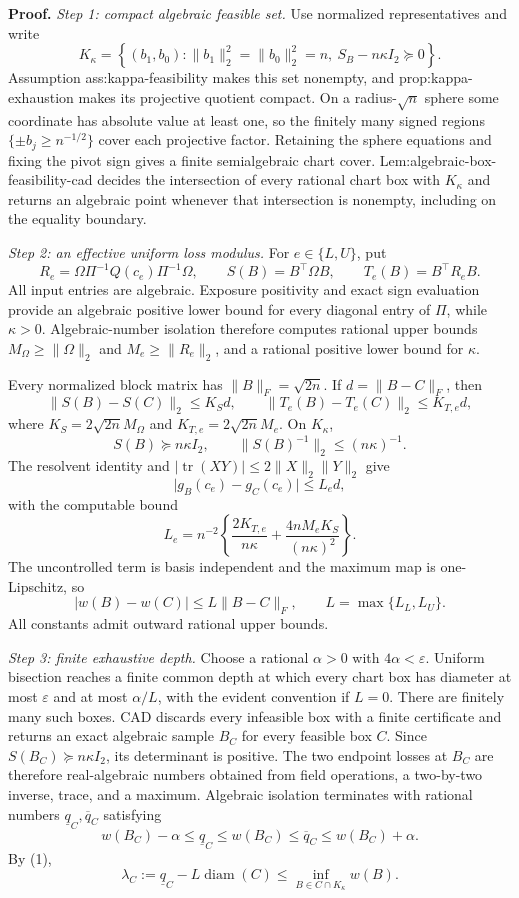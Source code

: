 \textbf{Proof.}
\emph{Step 1: compact algebraic feasible set.}
Use normalized representatives and write
\[
 K_\kappa=\left\{(b_1,b_0):
 \lVert b_1\rVert_2^2=\lVert b_0\rVert_2^2=n,
 \ S_B-n\kappa I_2\succeq0\right\}.
\]
Assumption ass:kappa-feasibility makes this set nonempty, and prop:kappa-exhaustion makes its projective quotient compact.  On a radius-\(\sqrt n\) sphere some coordinate has absolute value at least one, so the finitely many signed regions \(\{\pm b_j\ge n^{-1/2}\}\) cover each projective factor.  Retaining the sphere equations and fixing the pivot sign gives a finite semialgebraic chart cover.  Lem:algebraic-box-feasibility-cad decides the intersection of every rational chart box with \(K_\kappa\) and returns an algebraic point whenever that intersection is nonempty, including on the equality boundary.

\emph{Step 2: an effective uniform loss modulus.}
For \(e\in\{L,U\}\), put
\[
 R_e=\Omega\Pi^{-1}Q(c_e)\Pi^{-1}\Omega,
 \qquad S(B)=B^{\top}\Omega B,
 \qquad T_e(B)=B^{\top}R_eB.
\]
All input entries are algebraic.  Exposure positivity and exact sign evaluation provide an algebraic positive lower bound for every diagonal entry of \(\Pi\), while \(\kappa>0\).  Algebraic-number isolation therefore computes rational upper bounds \(M_\Omega\ge\lVert\Omega\rVert_2\) and \(M_e\ge\lVert R_e\rVert_2\), and a rational positive lower bound for \(\kappa\).

Every normalized block matrix has \(\lVert B\rVert_F=\sqrt{2n}\).  If \(d=\lVert B-C\rVert_F\), then
\[
 \lVert S(B)-S(C)\rVert_2\le K_Sd,
 \qquad
 \lVert T_e(B)-T_e(C)\rVert_2\le K_{T,e}d,
\]
where \(K_S=2\sqrt{2n}M_\Omega\) and \(K_{T,e}=2\sqrt{2n}M_e\).  On \(K_\kappa\),
\[
 S(B)\succeq n\kappa I_2,
 \qquad \lVert S(B)^{-1}\rVert_2\le(n\kappa)^{-1}.
\]
The resolvent identity and \(\lvert\operatorname{tr}(XY)\rvert\le2\lVert X\rVert_2\lVert Y\rVert_2\) give
\[
 \lvert g_B(c_e)-g_C(c_e)\rvert\le L_e d,
\]
with the computable bound
\[
 L_e=n^{-2}\left\{
 \frac{2K_{T,e}}{n\kappa}
 +\frac{4nM_eK_S}{(n\kappa)^2}\right\}.
\]
The uncontrolled term is basis independent and the maximum map is one-Lipschitz, so
\[
 \lvert w(B)-w(C)\rvert\le L\lVert B-C\rVert_F,
 \qquad L=\max\{L_L,L_U\}.
 \tag{1}
\]
All constants admit outward rational upper bounds.

\emph{Step 3: finite exhaustive depth.}
Choose a rational \(\alpha>0\) with \(4\alpha<\varepsilon\).  Uniform bisection reaches a finite common depth at which every chart box has diameter at most \(\varepsilon\) and at most \(\alpha/L\), with the evident convention if \(L=0\).  There are finitely many such boxes.  CAD discards every infeasible box with a finite certificate and returns an exact algebraic sample \(B_C\) for every feasible box \(C\).  Since \(S(B_C)\succeq n\kappa I_2\), its determinant is positive.  The two endpoint losses at \(B_C\) are therefore real-algebraic numbers obtained from field operations, a two-by-two inverse, trace, and a maximum.  Algebraic isolation terminates with rational numbers \(\underline q_C,\overline q_C\) satisfying
\[
 w(B_C)-\alpha\le\underline q_C\le w(B_C)
 \le\overline q_C\le w(B_C)+\alpha.
 \tag{2}
\]
By (1),
\[
 \lambda_C:=\underline q_C-L\operatorname{diam}(C)
 \le\inf_{B\in C\cap K_\kappa}w(B).
 \tag{3}
\]

